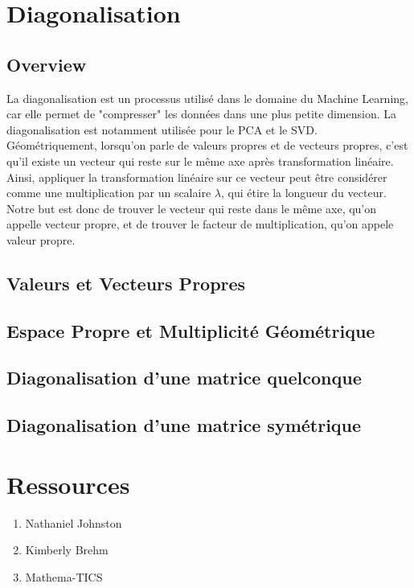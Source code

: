 \documentclass{article}
\begin{document}
\begin{intuition}

\end{intuition}

\begin{remark}

\end{remark}


\begin{problem}

\end{problem}

\pagebreak

\section{Diagonalisation}

\subsection{Overview}

La diagonalisation est un processus utilisé dans le domaine du Machine Learning,
car elle permet de "compresser" les données dans une plus petite dimension. La
diagonalisation est notamment utilisée pour le PCA et le SVD.\\

Géométriquement, lorsqu'on parle de valeurs propres et de vecteurs propres, c'est
qu'il existe un vecteur qui reste sur le même axe après transformation linéaire.
Ainsi, appliquer la transformation linéaire sur ce vecteur peut être considérer
comme une multiplication par un scalaire $\lambda$, qui étire la longueur du vecteur.
Notre but est donc de trouver le vecteur qui reste dans le même axe, qu'on appelle
vecteur propre, et de trouver le facteur de multiplication, qu'on appele valeur
propre.

\subsection{Valeurs et Vecteurs Propres}

\subsection{Espace Propre et Multiplicité Géométrique}

\subsection{Diagonalisation d'une matrice quelconque}

\subsection{Diagonalisation d'une matrice symétrique}

\pagebreak

\section{Ressources}%
\label{sec:Ressources}

\begin{enumerate}
    \item Nathaniel Johnston
    \item Kimberly Brehm
    \item Mathema-TICS
\end{enumerate}
\end{document}
